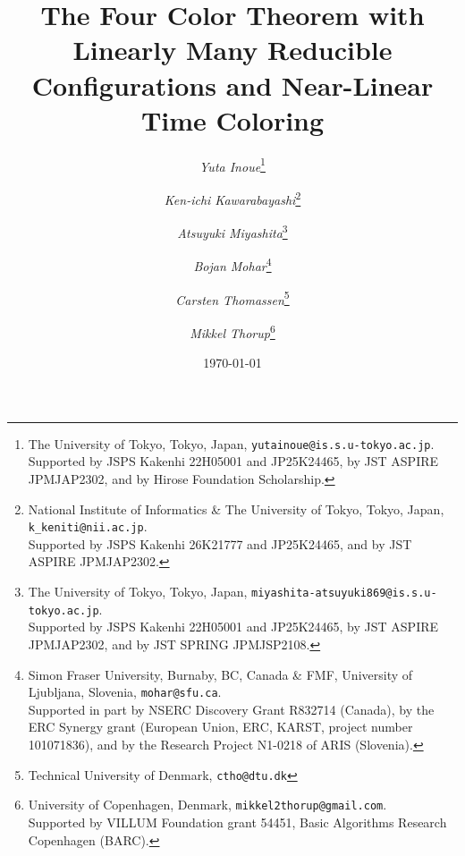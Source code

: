 \documentclass[10pt,a4paper]{article}
\title{The Four Color Theorem with Linearly Many  Reducible Configurations and Near-Linear Time Coloring}
\begin{document}
\author{
    {\em Yuta Inoue}\thanks{The University of Tokyo, Tokyo, Japan, \texttt{yutainoue@is.s.u-tokyo.ac.jp}.\\  
    Supported by JSPS Kakenhi 22H05001 and JP25K24465, by JST ASPIRE JPMJAP2302, and by Hirose Foundation Scholarship.}
    \and
    {\em Ken-ichi Kawarabayashi}\thanks{National Institute of Informatics \& The University of Tokyo, Tokyo, Japan, \texttt{k\_keniti@nii.ac.jp}.\\ 
    Supported by JSPS Kakenhi 26K21777 and JP25K24465, and by JST ASPIRE JPMJAP2302.}
    \and
    {\em Atsuyuki Miyashita}\thanks{The University of Tokyo, Tokyo, Japan, \texttt{miyashita-atsuyuki869@is.s.u-tokyo.ac.jp}.\\  
    Supported by JSPS Kakenhi 22H05001 and JP25K24465, by JST ASPIRE JPMJAP2302, and by JST SPRING JPMJSP2108.}
    \and
    {\em Bojan Mohar}\thanks{Simon Fraser University, Burnaby, BC, Canada \& FMF, University of Ljubljana, Slovenia, \texttt{mohar@sfu.ca}.\\ 
    Supported in part by NSERC Discovery Grant R832714 (Canada),
    by the ERC Synergy grant (European Union, ERC, KARST, project number 101071836),
    and by the Research Project N1-0218 of ARIS (Slovenia).}
    \and
    {\em Carsten Thomassen}\thanks{Technical University of Denmark, \texttt{ctho@dtu.dk}}
    \and
     {\em Mikkel Thorup}\thanks{ University of Copenhagen, Denmark, 
 \texttt{mikkel2thorup@gmail.com}.\\ 
 Supported by VILLUM Foundation grant 54451, Basic Algorithms Research Copenhagen (BARC).}}

\date{\today\vspace{-1cm}\\}


\maketitle
\end{document}
